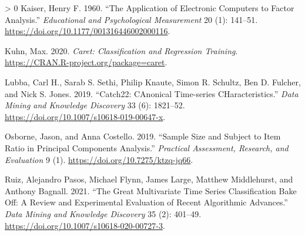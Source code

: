 \documentclass{article}
\newlength{\cslhangindent}
\newenvironment{CSLReferences}[3] %
 {%
  \setlength{\parindent}{0pt}
  \ifodd #1 \everypar{\setlength{\hangindent}{\cslhangindent}}\ignorespaces\fi
  \ifnum #2 > 0
  \setlength{\parskip}{#2\baselineskip}
  \fi
 }%
 {}
\begin{document}
\begin{CSLReferences}{1}{0}
\leavevmode\hypertarget{ref-Kaiser1960}{}%
Kaiser, Henry F. 1960. {``The Application of Electronic Computers to
Factor Analysis.''} \emph{Educational and Psychological Measurement} 20
(1): 141--51. \url{https://doi.org/10.1177/001316446002000116}.

\leavevmode\hypertarget{ref-caret}{}%
Kuhn, Max. 2020. \emph{Caret: Classification and Regression Training}.
\url{https://CRAN.R-project.org/package=caret}.

\leavevmode\hypertarget{ref-lubbaCatch22CAnonicalTimeseries2019}{}%
Lubba, Carl H., Sarab S. Sethi, Philip Knaute, Simon R. Schultz, Ben D.
Fulcher, and Nick S. Jones. 2019. {``Catch22: {CAnonical Time-series
CHaracteristics}.''} \emph{Data Mining and Knowledge Discovery} 33 (6):
1821--52. \url{https://doi.org/10.1007/s10618-019-00647-x}.

\leavevmode\hypertarget{ref-osborneSampleSizeSubject2019}{}%
Osborne, Jason, and Anna Costello. 2019. {``Sample Size and Subject to
Item Ratio in Principal Components Analysis.''} \emph{Practical
Assessment, Research, and Evaluation} 9 (1).
\url{https://doi.org/10.7275/ktzq-jq66}.

\leavevmode\hypertarget{ref-ruizGreatMultivariateTime2021}{}%
Ruiz, Alejandro Pasos, Michael Flynn, James Large, Matthew Middlehurst,
and Anthony Bagnall. 2021. {``The Great Multivariate Time Series
Classification Bake Off: A Review and Experimental Evaluation of Recent
Algorithmic Advances.''} \emph{Data Mining and Knowledge Discovery} 35
(2): 401--49. \url{https://doi.org/10.1007/s10618-020-00727-3}.

\end{CSLReferences}



\end{document}
